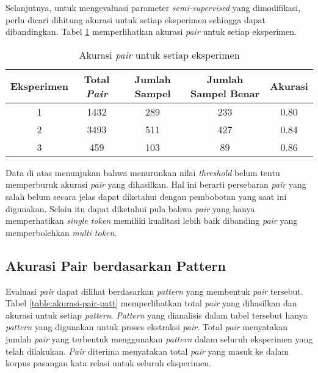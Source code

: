Selanjutnya, untuk mengevaluasi parameter \textit{semi-supervised} yang dimodifikasi, perlu dicari dihitung akurasi untuk setiap eksperimen sehingga dapat dibandingkan. Tabel \ref{table:akurasi-all} memperlihatkan akurasi \textit{pair} untuk setiap eksperimen.

\begin{table}
  \centering
  \caption{Akurasi \textit{pair} untuk setiap eksperimen}
  \label{table:akurasi-all}
  \begin{tabular}{|c|c|c|c|c|}
  \hline
  Eksperimen & Total \textit{Pair} & Jumlah Sampel & Jumlah Sampel Benar & Akurasi \\ \hline
  1 & 1432 & 289 & 233 & 0.80 \\ \hline
  2 & 3493 & 511 & 427 & 0.84 \\ \hline
  3 & 459  & 103 & 89  & 0.86 \\ \hline
  \end{tabular} 
\end{table}

Data di atas menunjukan bahwa menurunkan nilai \textit{threshold} belum tentu memperburuk akurasi \textit{pair} yang dihasilkan. Hal ini berarti persebaran \textit{pair} yang salah belum secara jelas dapat diketahui dengan pembobotan yang saat ini digunakan. Selain itu dapat diketahui pula bahwa \textit{pair} yang hanya memperhatikan \textit{single token} memiliki kualitasi lebih baik dibanding \textit{pair} yang memperbolehkan \textit{multi token}.

\subsection{Akurasi Pair berdasarkan Pattern}
Evaluasi \textit{pair} dapat dilihat berdasarkan \textit{pattern} yang membentuk \textit{pair} tersebut. Tabel \ref{table:akurasi-pair-patt} memperlihatkan total \textit{pair} yang dihasilkan dan akurasi untuk setiap \textit{pattern}. \textit{Pattern} yang dianalisis dalam tabel tersebut hanya \textit{pattern} yang digunakan untuk proses ekstraksi \textit{pair}. Total \textit{pair} menyatakan jumlah \textit{pair} yang terbentuk menggunakan \textit{pattern} dalam seluruh eksperimen yang telah dilakukan. \textit{Pair} diterima menyatakan total \textit{pair} yang masuk ke dalam korpus pasangan kata relasi untuk seluruh eksperimen.

